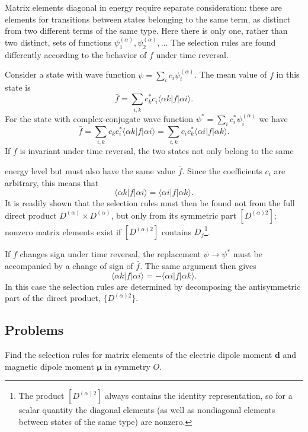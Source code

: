 Matrix elements diagonal in energy require separate consideration: these are elements for transitions between states belonging to the same term, as distinct from two different terms of the same type. Here there is only one, rather than two distinct, sets of functions $\psi_1^{(\alpha)},\psi_2^{(\alpha)},\ldots$ The selection rules are found differently according to the behavior of $f$ under time reversal.

Consider a state with wave function $\psi=\sum_i c_i\psi_i^{(\alpha)}$. The mean value of $f$ in this state is
\[
 \bar f=\sum_{i,k}c_k^*c_i\langle\alpha k|f|\alpha i\rangle.
\]
For the state with complex-conjugate wave function $\psi^*=\sum_i c_i^*\psi_i^{(\alpha)}$ we have
\[
 \bar f=\sum_{i,k}c_kc_i^*\langle\alpha k|f|\alpha i\rangle
 =\sum_{i,k}c_ic_k^*\langle\alpha i|f|\alpha k\rangle.
\]
If $f$ is invariant under time reversal, the two states not only belong to the same

energy level but must also have the same value $\bar f$. Since the coefficients $c_i$ are arbitrary, this means that
\[
 \langle\alpha k|f|\alpha i\rangle=\langle\alpha i|f|\alpha k\rangle.
\]
It is readily shown that the selection rules must then be found not from the full direct product $D^{(\alpha)}\times D^{(\alpha)}$, but only from its symmetric part $[D^{(\alpha)2}]$; nonzero matrix elements exist if $[D^{(\alpha)2}]$ contains $D_f$\footnote{The product $[D^{(\alpha)2}]$ always contains the identity representation, so for a scalar quantity the diagonal elements (as well as nondiagonal elements between states of the same type) are nonzero.}.

If $f$ changes sign under time reversal, the replacement $\psi\to\psi^*$ must be accompanied by a change of sign of $\bar f$. The same argument then gives
\[
 \langle\alpha k|f|\alpha i\rangle=-\langle\alpha i|f|\alpha k\rangle.
\]
In this case the selection rules are determined by decomposing the antisymmetric part of the direct product, $\{D^{(\alpha)2}\}$.

\subsection*{Problems}

 Find the selection rules for matrix elements of the electric dipole moment $\mathbf d$ and magnetic dipole moment $\boldsymbol\mu$ in symmetry $O$.

